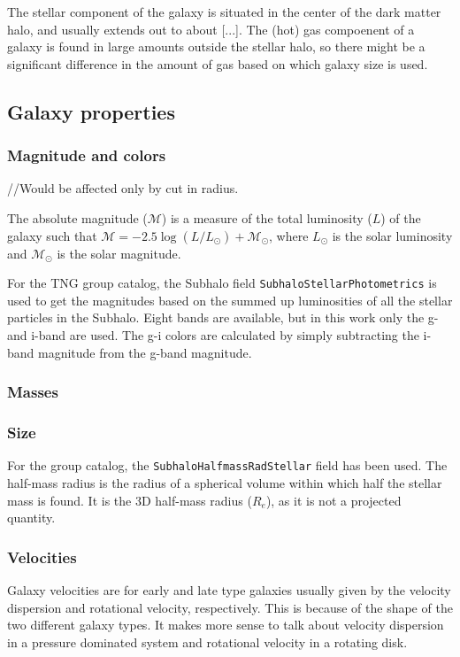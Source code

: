 The stellar component of the galaxy is situated in the center of the dark matter halo, and usually extends out to about [...]. The (hot) gas compoenent of a galaxy is found in large amounts outside the stellar halo, so there might be a significant difference in the amount of gas based on which galaxy size is used.

\subsection{Galaxy properties}

\subsubsection{Magnitude and colors}
//Would be affected only by cut in radius.

The absolute magnitude ($\mathcal{M}$) is a measure of the total luminosity ($L$) of the galaxy such that $\mathcal{M} = -2.5 \log(L/L_\odot) + \mathcal{M}_\odot$, where $L_\odot$ is the solar luminosity and $\mathcal{M}_\odot$ is the solar magnitude.

For the TNG group catalog, the Subhalo field \texttt{SubhaloStellarPhotometrics} is used to get the magnitudes based on the summed up luminosities of all the stellar particles in the Subhalo. Eight bands are available, but in this work only the g- and i-band are used. The g-i colors are calculated by simply subtracting the i-band magnitude from the g-band magnitude.

\subsubsection{Masses}

\subsubsection{Size}
For the group catalog, the \texttt{SubhaloHalfmassRadStellar} field has been used. The half-mass radius is the radius of a spherical volume within which half the stellar mass is found. It is the 3D half-mass radius ($R_e$), as it is not a projected quantity.

\subsubsection{Velocities}

Galaxy velocities are for early and late type galaxies usually given by the velocity dispersion and rotational velocity, respectively. This is because of the shape of the two different galaxy types. It makes more sense to talk about velocity dispersion in a pressure dominated system and rotational velocity in a rotating disk.

